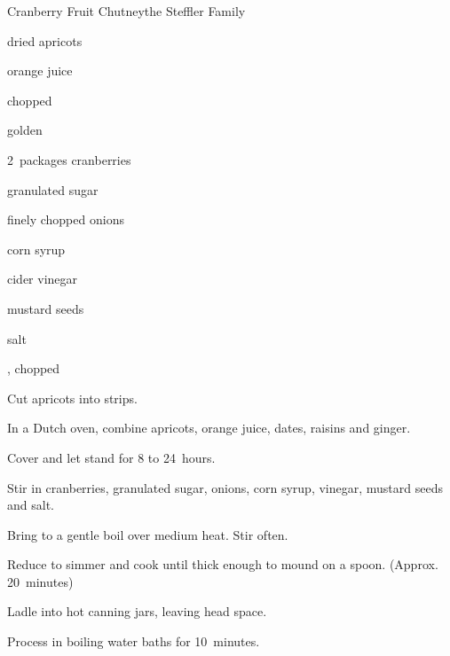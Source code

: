 \begin{recipe}{Cranberry Fruit Chutney}{the Steffler Family}{}

\begin{ingredients}
\item {} dried apricots
\item \C{2\half} orange juice
\item {} chopped 
\item \C{\half} golden 
\item 2~packages cranberries
\item \C{1\half} granulated sugar
\item \C{1\quarter} finely chopped onions
\item \C{\threequarter} corn syrup
\item \C{\threequarter} cider vinegar
\item \tp{1\half} mustard seeds
\item \tp{\quarter} salt
\item \C{\half} , chopped
\end{ingredients}

\begin{directions}
\item Cut apricots into \cm{\half} strips.
\item In a Dutch oven, combine apricots, orange juice, dates, raisins and ginger.
\item Cover and let stand for 8 to 24~hours.
\item Stir in cranberries, granulated sugar, onions, corn syrup, vinegar, mustard seeds and salt.
\item Bring to a gentle boil over medium heat. Stir often.
\item Reduce to simmer and cook until thick enough to mound on a spoon. (Approx. 20~minutes)
\item Ladle into  hot canning jars, leaving \cm{\half} head space.
\item Process in boiling water baths for 10~minutes.
\end{directions}
\end{recipe}
